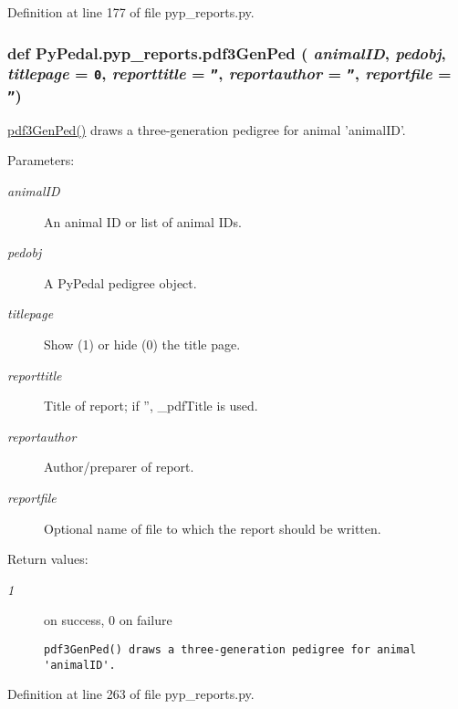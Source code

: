 Definition at line 177 of file pyp\_\-reports.py.\hypertarget{namespacePyPedal_1_1pyp__reports_d6ab6b0b0f5c79b36a1c97842bb552d4}{
\subsubsection[pdf3GenPed]{\setlength{\rightskip}{0pt plus 5cm}def Py\-Pedal.pyp\_\-reports.pdf3Gen\-Ped ( {\em animal\-ID},  {\em pedobj},  {\em titlepage} = {\tt 0},  {\em reporttitle} = {\tt ''},  {\em reportauthor} = {\tt ''},  {\em reportfile} = {\tt ''})}}
\label{namespacePyPedal_1_1pyp__reports_d6ab6b0b0f5c79b36a1c97842bb552d4}


\hyperlink{namespacePyPedal_1_1pyp__reports_d6ab6b0b0f5c79b36a1c97842bb552d4}{pdf3Gen\-Ped()} draws a three-generation pedigree for animal 'animal\-ID'. 

\begin{Desc}
\item[Parameters:]
\begin{description}
\item[{\em animal\-ID}]An animal ID or list of animal IDs. \item[{\em pedobj}]A Py\-Pedal pedigree object. \item[{\em titlepage}]Show (1) or hide (0) the title page. \item[{\em reporttitle}]Title of report; if '', \_\-pdf\-Title is used. \item[{\em reportauthor}]Author/preparer of report. \item[{\em reportfile}]Optional name of file to which the report should be written. \end{description}
\end{Desc}
\begin{Desc}
\item[Return values:]
\begin{description}
\item[{\em 1}]on success, 0 on failure

\footnotesize\begin{verbatim}pdf3GenPed() draws a three-generation pedigree for animal 'animalID'.
\end{verbatim}
\normalsize
 \end{description}
\end{Desc}


Definition at line 263 of file pyp\_\-reports.py.